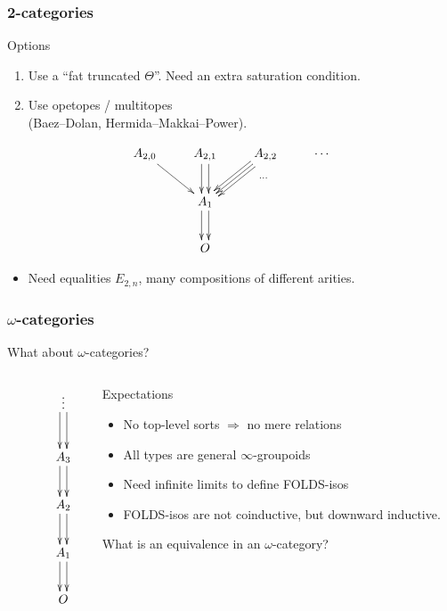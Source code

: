 \documentclass{beamer}
\begin{document}
\begin{frame}[t]
  \frametitle{2-categories}
  \begin{block}{Options}
    \begin{enumerate}
    \item Use a ``fat truncated $\Theta$''.  Need an extra \alert<1>{saturation} condition.
      \pause
    \item Use \alert{opetopes} / \alert{multitopes} \\(Baez--Dolan, Hermida--Makkai--Power).
    \end{enumerate}
  \end{block}
  \[
  \vcenter{\xymatrix{
      A_{2,0} \ar[dr]
      & A_{2,1} \ar@<1mm>[d] \ar@<-1mm>[d]
      & A_{2,2} \ar@<1mm>[dl] \ar@<-1mm>[dl] \ar[dl]
      & \cdots \ar@{}[dll]|{\cdots} \\
      & A_1 \ar@<1mm>[d] \ar@<-1mm>[d] \\
      & O}}
  \]
  \begin{itemize}
  \item Need equalities $E_{2,n}$, many compositions of different arities.
  \end{itemize}
\end{frame}

\begin{frame}
  \frametitle{$\omega$-categories}
  What about $\omega$-categories?
  \begin{columns}
    \begin{column}{2cm}
      \[
      \vcenter{\xymatrix{
          & \vdots \ar@<1mm>[d] \ar@<-1mm>[d] \\
          & A_3 \ar@<1mm>[d] \ar@<-1mm>[d] \\
          & A_2 \ar@<1mm>[d] \ar@<-1mm>[d] \\
          & A_1 \ar@<1mm>[d] \ar@<-1mm>[d] \\
          & O}}
      \]
    \end{column}
    \begin{column}{8cm}
      \begin{block}{Expectations}
        \begin{itemize}
        \item No top-level sorts $\Rightarrow$ no mere relations
        \item All types are general $\infty$-groupoids
        \item Need infinite limits to define FOLDS-isos
          \pause
        \item FOLDS-isos are \alert{not} coinductive, but downward inductive.
        \end{itemize}
      \end{block}
      What is an equivalence in an $\omega$-category?
    \end{column}
  \end{columns}
\end{frame}
\end{document}
